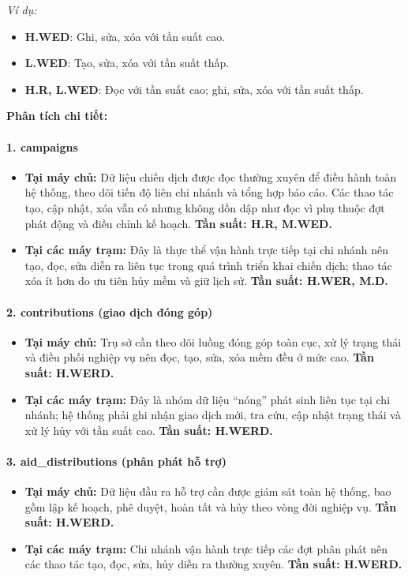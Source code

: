\documentclass[12pt,a4paper]{article}
\begin{document}
\textit{Ví dụ:}
\begin{itemize}
    \item \textbf{H.WED}: Ghi, sửa, xóa với tần suất cao.
    \item \textbf{L.WED}: Tạo, sửa, xóa với tần suất thấp.
    \item \textbf{H.R, L.WED}: Đọc với tần suất cao; ghi, sửa, xóa với tần suất thấp.
\end{itemize}

\textbf{Phân tích chi tiết:}

\paragraph{1. campaigns} \mbox{}
\begin{itemize}
    \item \textbf{Tại máy chủ:} Dữ liệu chiến dịch được đọc thường xuyên để điều hành toàn hệ thống, theo dõi tiến độ liên chi nhánh và tổng hợp báo cáo. Các thao tác tạo, cập nhật, xóa vẫn có nhưng không dồn dập như đọc vì phụ thuộc đợt phát động và điều chỉnh kế hoạch. \textbf{Tần suất: H.R, M.WED.}
    \item \textbf{Tại các máy trạm:} Đây là thực thể vận hành trực tiếp tại chi nhánh nên tạo, đọc, sửa diễn ra liên tục trong quá trình triển khai chiến dịch; thao tác xóa ít hơn do ưu tiên hủy mềm và giữ lịch sử. \textbf{Tần suất: H.WER, M.D.}
\end{itemize}

\paragraph{2. contributions (giao dịch đóng góp)} \mbox{}
\begin{itemize}
    \item \textbf{Tại máy chủ:} Trụ sở cần theo dõi luồng đóng góp toàn cục, xử lý trạng thái và điều phối nghiệp vụ nên đọc, tạo, sửa, xóa mềm đều ở mức cao. \textbf{Tần suất: H.WERD.}
    \item \textbf{Tại các máy trạm:} Đây là nhóm dữ liệu ``nóng'' phát sinh liên tục tại chi nhánh; hệ thống phải ghi nhận giao dịch mới, tra cứu, cập nhật trạng thái và xử lý hủy với tần suất cao. \textbf{Tần suất: H.WERD.}
\end{itemize}

\paragraph{3. aid\_distributions (phân phát hỗ trợ)} \mbox{}
\begin{itemize}
    \item \textbf{Tại máy chủ:} Dữ liệu đầu ra hỗ trợ cần được giám sát toàn hệ thống, bao gồm lập kế hoạch, phê duyệt, hoàn tất và hủy theo vòng đời nghiệp vụ. \textbf{Tần suất: H.WERD.}
    \item \textbf{Tại các máy trạm:} Chi nhánh vận hành trực tiếp các đợt phân phát nên các thao tác tạo, đọc, sửa, hủy diễn ra thường xuyên. \textbf{Tần suất: H.WERD.}
\end{itemize}
\end{document}
